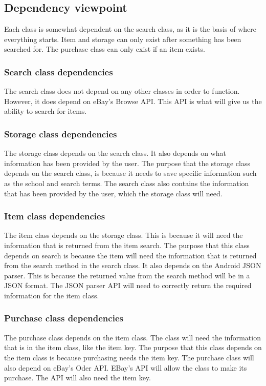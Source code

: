 \documentclass[journal,compsoc, 10pt, draftclsnofoot, onecolumn]{IEEEtran}
\begin{document}
\subsection{Dependency viewpoint}
Each class is somewhat dependent on the search class, as it is the basis of 
where everything starts. Item and storage can only exist after something has 
been searched for. The purchase class can only exist if an item exists.

\subsubsection*{Search class dependencies}
The search class does not depend on any other classes in order to function. 
However, it does depend on eBay's Browse API. This API is what will give us the 
ability to search for items.

\subsubsection*{Storage class dependencies}
The storage class depends on the search class. It also depends on what 
information has been provided by the user. The purpose that the storage class 
depends on the search class, is because it needs to save specific information 
such as the school and search terms. The search class also contains the information 
that has been provided by the user, which the storage class will need. 

\subsubsection*{Item class dependencies}
The item class depends on the storage class. This is because it will need 
the information that is returned from the item search. The purpose that this 
class depends on search is because the item will need the information that is 
returned from the search method in the search class. It also depends on the 
Android JSON parser. This is because the returned value from the search method 
will be in a JSON format. The JSON parser API will need to correctly return the 
required information for the item class.

\subsubsection*{Purchase class dependencies}
The purchase class depends on the item class. The class will need the 
information that is in the item class, like the item key. The purpose that this 
class depends on the item class is because purchasing needs the item key. The 
purchase class will also depend on eBay's Oder API. EBay's API will allow the 
class to make its purchase. The API will also need the item key. 
\end{document}
